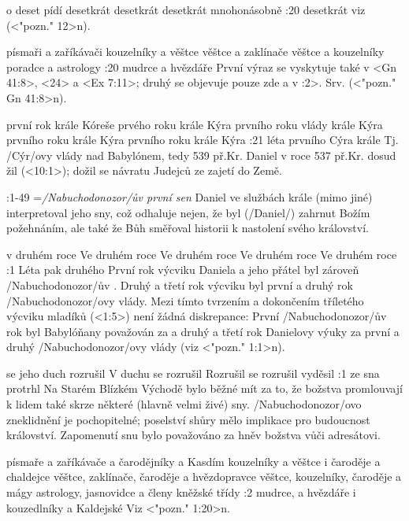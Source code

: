     {o deset pídí} %
    {desetkrát}  %
    {desetkrát} %
    {desetkrát}  %
    {mnohonásobně}  %
:20 {desetkrát} viz (<"pozn." 12>n).

    {písmaři a zaříkávači} %
    {kouzelníky a věštce}  %
    {věštce a zaklínače} %
    {věštce a kouzelníky}  %
    {poradce a astrology}  %
:20 {mudrce a hvězdáře} První výraz se vyskytuje také v <Gn 41:8>, <24> a <Ex 7:11>; druhý se objevuje pouze zde a v :2>. Srv. (<"pozn." Gn 41:8>n). \dopsat %

    {první rok krále Kóreše} %
    {prvého roku krále Kýra}  %
    {prvního roku vlády krále Kýra} %
    {prvního roku krále Kýra}  %
    {prvního roku krále Kýra}  %
:21 {léta prvního Cýra krále} Tj. \x/Cýr/ovy vlády nad Babylónem, tedy 539 př.Kr. Daniel v roce 537 př.Kr. dosud žil (<10:1>); dožil se návratu Judejců ze zajetí do Země.

:1-49 {}={\it\x/Nabuchodonozor/ův první sen\/} Daniel ve službách krále (mimo jiné) interpretoval jeho sny, což odhaluje nejen, že  byl (\x/Daniel/) zahrnut Božím požehnáním, ale také že Bůh směřoval historii  k nastolení svého království.

    {v druhém roce} %
    {Ve druhém roce}  %
    {Ve druhém roce} %
    {Ve druhém roce}  %
    {Ve druhém roce}  %
:1 {Léta pak druhého} První rok výcviku Daniela a jeho přátel byl
zároveň \x/Nabuchodonozor/ův . Druhý a třetí rok výcviku byl první a druhý rok
\x/Nabuchodonozor/ovy vlády.  %
Mezi tímto tvrzením a dokončením tříletého výcviku mladíků (<1:5>) není žádná diskrepance: 
První  \x/Nabuchodonozor/ův rok byl Babylóňany považován za  a druhý a třetí rok Danielovy výuky za první a druhý  \x/Nabuchodonozor/ovy vlády (viz <"pozn." 1:1>n).

    {se jeho duch rozrušil} %
    {V duchu se rozrušil}  %
    {Rozrušil se} %
    {rozrušil}  %
    {vyděsil}  %
:1 {ze sna protrhl} Na Starém Blízkém Východě bylo běžné mít za to, že božstva promlouvají k lidem také skrze některé (hlavně velmi živé) sny. \x/Nabuchodonozor/ovo zneklidnění je pochopitelné; poselství shůry mělo implikace pro budoucnost království. Zapomenutí snu bylo považováno za hněv božstva vůči adresátovi.


    {písmaře a zaříkávače a čarodějníky a Kasdím} %
    {kouzelníky a věštce i čaroděje a chaldejce}  %
    {věštce, zaklínače, čaroděje a hvězdopravce} %
    {věštce, kouzelníky, čaroděje a mágy}  %
    {astrology, jasnovidce a členy kněžské třídy}  %
:2 {mudrce, a hvězdáře i kouzedlníky a Kaldejské} Viz <"pozn." 1:20>n. 


